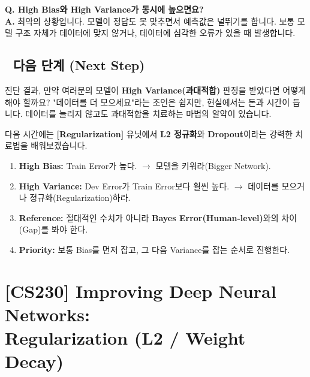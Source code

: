 \documentclass[11pt,a4paper]{book}
\theoremstyle{definition}
\begin{document}
\textbf{Q. High Bias와 High Variance가 동시에 높으면요?} \\
\textbf{A.} 최악의 상황입니다. 모델이 정답도 못 맞추면서 예측값은 널뛰기를 합니다. 보통 모델 구조 자체가 데이터에 맞지 않거나, 데이터에 심각한 오류가 있을 때 발생합니다.

\section*{🔗 다음 단계 (Next Step)}
진단 결과, 만약 여러분의 모델이 \textbf{High Variance(과대적합)} 판정을 받았다면 어떻게 해야 할까요?
"데이터를 더 모으세요"라는 조언은 쉽지만, 현실에서는 돈과 시간이 듭니다. 데이터를 늘리지 않고도 과대적합을 치료하는 마법의 알약이 있습니다.

다음 시간에는 \textbf{[Regularization]} 유닛에서 \textbf{L2 정규화}와 \textbf{Dropout}이라는 강력한 치료법을 배워보겠습니다.

\vspace{0.5cm}

\begin{summarybox}[title={단원 요약 (Cheat Sheet)}]
\begin{enumerate}
    \item \textbf{High Bias:} Train Error가 높다. $\rightarrow$ 모델을 키워라(Bigger Network).
    \item \textbf{High Variance:} Dev Error가 Train Error보다 훨씬 높다. $\rightarrow$ 데이터를 모으거나 정규화(Regularization)하라.
    \item \textbf{Reference:} 절대적인 수치가 아니라 \textbf{Bayes Error(Human-level)}와의 차이(Gap)를 봐야 한다.
    \item \textbf{Priority:} 보통 Bias를 먼저 잡고, 그 다음 Variance를 잡는 순서로 진행한다.
\end{enumerate}
\end{summarybox}


\chapter{[CS230] Improving Deep Neural Networks: \\ Regularization (L2 / Weight Decay)}
\label{ch:lecture13}
\end{document}
